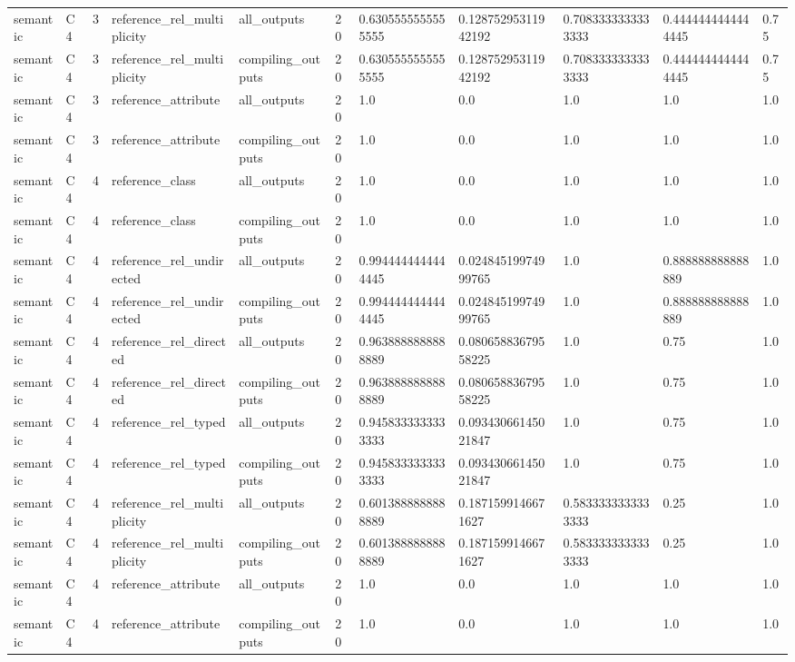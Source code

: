 \begin{tabular}{lllllllllll}
semantic & C4 & 3 & reference\_rel\_multiplicity & all\_outputs & 20 & 0.6305555555555555 & 0.12875295311942192 & 0.7083333333333333 & 0.4444444444444445 & 0.75 \\
semantic & C4 & 3 & reference\_rel\_multiplicity & compiling\_outputs & 20 & 0.6305555555555555 & 0.12875295311942192 & 0.7083333333333333 & 0.4444444444444445 & 0.75 \\
semantic & C4 & 3 & reference\_attribute & all\_outputs & 20 & 1.0 & 0.0 & 1.0 & 1.0 & 1.0 \\
semantic & C4 & 3 & reference\_attribute & compiling\_outputs & 20 & 1.0 & 0.0 & 1.0 & 1.0 & 1.0 \\
semantic & C4 & 4 & reference\_class & all\_outputs & 20 & 1.0 & 0.0 & 1.0 & 1.0 & 1.0 \\
semantic & C4 & 4 & reference\_class & compiling\_outputs & 20 & 1.0 & 0.0 & 1.0 & 1.0 & 1.0 \\
semantic & C4 & 4 & reference\_rel\_undirected & all\_outputs & 20 & 0.9944444444444445 & 0.02484519974999765 & 1.0 & 0.888888888888889 & 1.0 \\
semantic & C4 & 4 & reference\_rel\_undirected & compiling\_outputs & 20 & 0.9944444444444445 & 0.02484519974999765 & 1.0 & 0.888888888888889 & 1.0 \\
semantic & C4 & 4 & reference\_rel\_directed & all\_outputs & 20 & 0.9638888888888889 & 0.08065883679558225 & 1.0 & 0.75 & 1.0 \\
semantic & C4 & 4 & reference\_rel\_directed & compiling\_outputs & 20 & 0.9638888888888889 & 0.08065883679558225 & 1.0 & 0.75 & 1.0 \\
semantic & C4 & 4 & reference\_rel\_typed & all\_outputs & 20 & 0.9458333333333333 & 0.09343066145021847 & 1.0 & 0.75 & 1.0 \\
semantic & C4 & 4 & reference\_rel\_typed & compiling\_outputs & 20 & 0.9458333333333333 & 0.09343066145021847 & 1.0 & 0.75 & 1.0 \\
semantic & C4 & 4 & reference\_rel\_multiplicity & all\_outputs & 20 & 0.6013888888888889 & 0.1871599146671627 & 0.5833333333333333 & 0.25 & 1.0 \\
semantic & C4 & 4 & reference\_rel\_multiplicity & compiling\_outputs & 20 & 0.6013888888888889 & 0.1871599146671627 & 0.5833333333333333 & 0.25 & 1.0 \\
semantic & C4 & 4 & reference\_attribute & all\_outputs & 20 & 1.0 & 0.0 & 1.0 & 1.0 & 1.0 \\
semantic & C4 & 4 & reference\_attribute & compiling\_outputs & 20 & 1.0 & 0.0 & 1.0 & 1.0 & 1.0 \\

\end{tabular}
